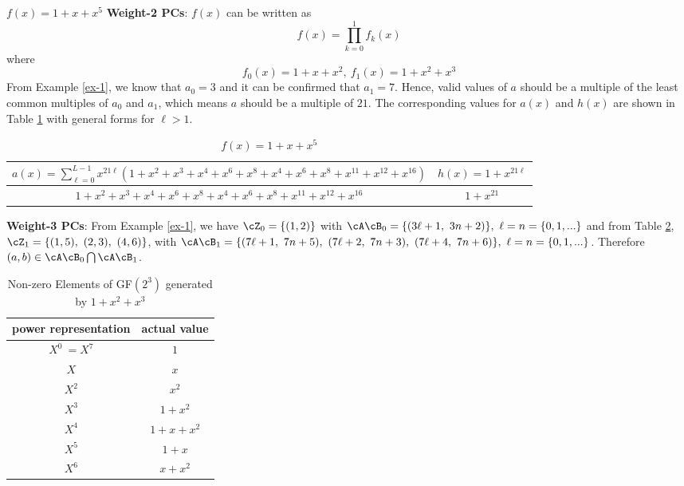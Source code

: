 \begin{example}
$f(x)=1+x+x^5$\newline
\textbf{Weight-2 PCs}: $f(x)$ can be written as 
$$f(x)=\prod_{k=0}^{1}f_k(x)$$
where 
$$f_0(x)=1+x+x^2,~f_1(x)=1+x^2+x^3$$ 
From Example \ref{ex-1}, we know that $a_0=3$ and it can be confirmed that $a_1=7$.
Hence, valid values of $a$ should be a multiple of the least common multiples of $a_0$ and $a_1$, which means $a$ should be a multiple of $21$.
The corresponding values for $a(x)$ and $h(x)$ are shown in Table \ref{novelTab1-c} with general forms for $\ell>1$.

\begin{table}[htbp]
\renewcommand{\arraystretch}{1.3}
 \caption{$f(x)=1+x+x^5$}
 \centering
\begin{tabular}{c c } 
\hline
 $a(x)=\sum_{\ell=0}^{L-1} x^{21\ell}(1+x^2+x^3+x^4+x^6+x^8+x^{4}+x^{6}+x^{8}+x^{11}+x^{12}+x^{16})$ & $h(x)=1+x^{21\ell}$ \\ [0.5ex] 
\hline\hline
$1+x^2+x^3+x^4+x^6+x^8+x^{4}+x^{6}+x^{8}+x^{11}+x^{12}+x^{16}$ & $1+x^{21}$\\ 
\end{tabular}
 \label{novelTab1-c}
\end{table}

\textbf{Weight-3 PCs}:
From Example \ref{ex-1}, we have $\cZ_0=\{ (1,2)\}$ with $\cA \cB_0=\{( 3\ell+1,~3n+2)\},~\ell=n=\{0,1,...\}$ and from Table \ref{novelTabWt3-5}, $ \cZ_1=\{(1,5),~(2,3),~(4,6)\}$, with $\cA \cB_1=\{(7\ell+1,~7n+5),~(7\ell+2,~7n+3),~(7\ell+4,~7n+6) \},~\ell=n=\{0,1,...\}$. Therefore $(a,b) \in \cA \cB_0 \bigcap \cA \cB_1$.

\begin{table}[htbp]
 \caption{Non-zero Elements of GF$(2^3)$ generated by $1+x^2+x^3$}
\centering
 \begin{tabular}{c c} 
 \hline
 power representation & actual value \\ [0.5ex] 
 \hline\hline
$X^0~=X^7$ & $1$\\
\hline
$X$ & $x$\\
\hline
$X^2$ &  $x^2$\\
\hline
$X^3$ &  $1+x^2$\\
\hline
$X^4$ &  $1+x+x^2$\\
\hline
$X^5$ &  $1+x$\\
\hline
$X^6$ &  $x+x^2$\\
\hline
 \end{tabular}
 \label{novelTabWt3-5}
\end{table}


\end{example}
